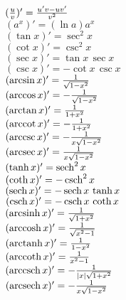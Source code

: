 \def\sinh{\mathop{\rm sinh}\nolimits}
\def\cosh{\mathop{\rm cosh}\nolimits}
\def\sech{\mathop{\rm sech}\nolimits}
\def\csch{\mathop{\rm csch}\nolimits}
\def\coth{\mathop{\rm coth}\nolimits}
\def\tanh{\mathop{\rm tanh}\nolimits}

\def\arccot{\mathop{\rm arccot}\nolimits}
\def\arcsec{\mathop{\rm arcsec}\nolimits}
\def\arccsc{\mathop{\rm arccsc}\nolimits}
\def\arcsinh{\mathop{\rm arcsinh}\nolimits}
\def\arccosh{\mathop{\rm arccosh}\nolimits}
\def\arctanh{\mathop{\rm arctanh}\nolimits}
\def\arccoth{\mathop{\rm arccoth}\nolimits}
\def\arcsech{\mathop{\rm arcsech}\nolimits}
\def\arccsch{\mathop{\rm arccsch}\nolimits}
\begin{small}
\begin{flushleft}
\begin{multicols}{2}
	$ ({u \over v})' = {u'v - uv' \over v^2 } $ \\
	$ (a^x)' = (\ln a) a^x $ \\
	$ (\tan x)' = \sec^2 x $ \\
	$ (\cot x)' = \csc^2 x $ \\
	$ (\sec x)' = \tan x\, \sec x $ \\
	$ (\csc x)' = - \cot x\, \csc x $ \\
	$ (\arcsin x)' = {1 \over \sqrt{1-x^2}} $ \\
	$ (\arccos x)' = -{1 \over \sqrt{1-x^2}} $ \\
	$ (\arctan x)' = {1 \over 1+x^2} $ \\
	$ (\arccot x)' = -{1 \over 1+x^2} $ \\
	$ (\arccsc x)' = -{1 \over x \sqrt{1-x^2}} $ \\
	$ (\arcsec x)' = {1 \over x \sqrt{1-x^2}} $ \\
	$ (\tanh x)' = \sech^2 x $ \\
	$ (\coth x)' = -\csch^2 x $ \\
	$ (\sech x)' = -\sech x \, \tanh x $ \\
	$ (\csch x)' = -\csch x \, \coth x $ \\
	$ (\arcsinh x)' = {1 \over \sqrt{1+x^2}} $ \\
	$ (\arccosh x)' = {1 \over \sqrt{x^2-1}} $ \\
	$ (\arctanh x)' = {1 \over 1-x^2} $ \\
	$ (\arccoth x)' = {1 \over x^2-1} $ \\
	$ (\arccsch x)' = -{1 \over \vert x \vert \sqrt{1+x^2}} $ \\
	$ (\arcsech x)' = -{1 \over x \sqrt{1-x^2}} $ \\
\end{multicols}
\end{flushleft}
\end{small}

